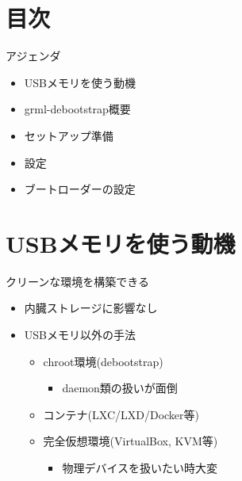 \section{目次}

\begin{frame}{アジェンダ}
  \begin{itemize}
  \item USBメモリを使う動機
  \item grml-debootstrap概要
  \item セットアップ準備
  \item 設定
  \item ブートローダーの設定
  \end{itemize}
\end{frame}


\section{USBメモリを使う動機}

\begin{frame}[containsverbatim]{クリーンな環境を構築できる}
  \begin{itemize}
  \item 内臓ストレージに影響なし
  \item USBメモリ以外の手法
    \begin{itemize}
    \item chroot環境(debootstrap)
      \begin{itemize}
      \item daemon類の扱いが面倒
      \end{itemize}
    \item コンテナ(LXC/LXD/Docker等)
    \item 完全仮想環境(VirtualBox, KVM等)
      \begin{itemize}
      \item 物理デバイスを扱いたい時大変
      \end{itemize}
    \end{itemize}
  \end{itemize}
\end{frame}


